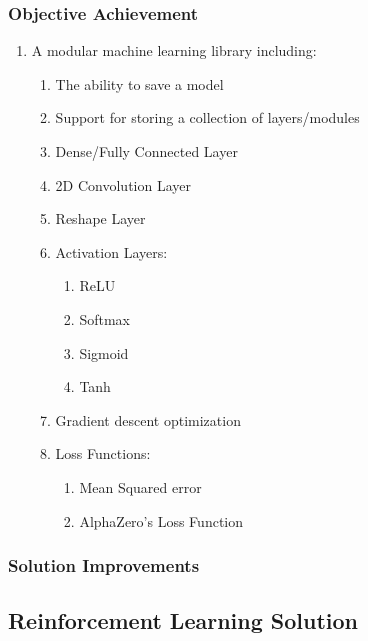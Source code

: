 \documentclass{article}
\begin{document}
    \subsubsection{Objective Achievement}
    \begin{enumerate} 
        \item A modular machine learning library including:
        \begin{enumerate}
            \item The ability to save a model
            \item Support for storing a collection of layers/modules
            \item Dense/Fully Connected Layer
            \item 2D Convolution Layer
            \item Reshape Layer
            \item Activation Layers:
            \begin{enumerate}
                \item ReLU
                \item Softmax
                \item Sigmoid
                \item Tanh
            \end{enumerate} 
            \item Gradient descent optimization
            \item Loss Functions:
            \begin{enumerate}
                \item Mean Squared error
                \item AlphaZero's Loss Function
            \end{enumerate}
        \end{enumerate}
    \end{enumerate}

    \subsubsection{Solution Improvements}

    \subsection{Reinforcement Learning Solution}
\end{document}
